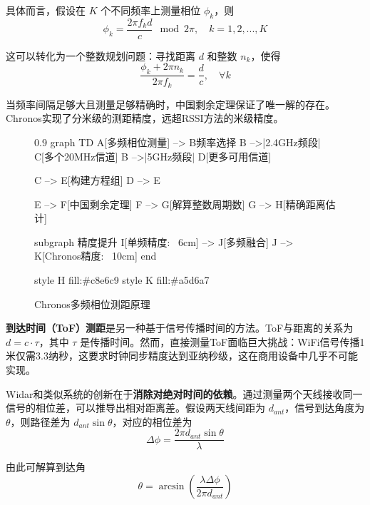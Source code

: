 具体而言，假设在 $K$ 个不同频率上测量相位 $\phi_k$，则
\begin{equation}
    \phi_k = \frac{2\pi f_k d}{c} \mod 2\pi, \quad k = 1, 2, ..., K
\end{equation}

这可以转化为一个整数规划问题：寻找距离 $d$ 和整数 $n_k$，使得
\begin{equation}
    \frac{\phi_k + 2\pi n_k}{2\pi f_k} = \frac{d}{c}, \quad \forall k
\end{equation}

当频率间隔足够大且测量足够精确时，中国剩余定理保证了唯一解的存在。Chronos实现了分米级的测距精度，远超RSSI方法的米级精度。

\begin{figure}[htbp]
    \centering
    \begin{mmd}{0.9\textwidth}
graph TD
    A[多频相位测量] --> B{频率选择}
    B -->|2.4GHz频段| C[多个20MHz信道]
    B -->|5GHz频段| D[更多可用信道]
    
    C --> E[构建方程组]
    D --> E
    
    E --> F[中国剩余定理]
    F --> G[解算整数周期数]
    G --> H[精确距离估计]
    
    subgraph 精度提升
        I[单频精度: ~6cm] --> J[多频融合]
        J --> K[Chronos精度: ~10cm]
    end
    
    style H fill:#c8e6c9
    style K fill:#a5d6a7
    \end{mmd}
    \caption{Chronos多频相位测距原理}
    \label{fig:chronos-ranging}
\end{figure}

\textbf{到达时间（ToF）测距}是另一种基于信号传播时间的方法。ToF与距离的关系为 $d = c \cdot \tau$，其中 $\tau$ 是传播时间。然而，直接测量ToF面临巨大挑战：WiFi信号传播1米仅需3.3纳秒，这要求时钟同步精度达到亚纳秒级，这在商用设备中几乎不可能实现。

Widar和类似系统的创新在于\textbf{消除对绝对时间的依赖}。通过测量两个天线接收同一信号的相位差，可以推导出相对距离差。假设两天线间距为 $d_{ant}$，信号到达角度为 $\theta$，则路径差为 $d_{ant} \sin\theta$，对应的相位差为
\begin{equation}
    \Delta\phi = \frac{2\pi d_{ant} \sin\theta}{\lambda}
\end{equation}

由此可解算到达角
\begin{equation}
    \theta = \arcsin\left(\frac{\lambda \Delta\phi}{2\pi d_{ant}}\right)
\end{equation}

